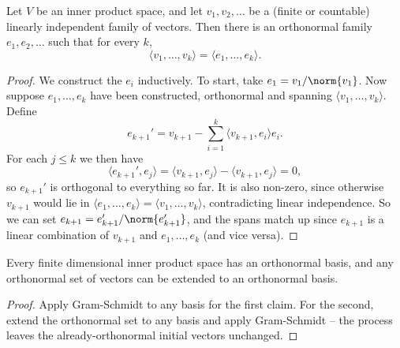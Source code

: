 \begin{center}
\end{center}

\begin{theorem}
    Let $V$ be an inner product space, and let $v_1, v_2, \dots$ be a (finite or countable) linearly independent family of vectors. Then there is an orthonormal family $e_1, e_2, \dots$ such that for every $k$,
    $$
    \langle v_1, \dots, v_k \rangle = \langle e_1, \dots, e_k \rangle.
    $$
\end{theorem}
\begin{proof}
    We construct the $e_i$ inductively. To start, take $e_1 = v_1/\norm{v_1}$. Now suppose $e_1, \dots, e_k$ have been constructed, orthonormal and spanning $\langle v_1, \dots, v_k\rangle$. Define
    $$
    e_{k+1}' = v_{k + 1} - \sum_{i = 1}^k \langle v_{k+1}, e_i \rangle e_i.
    $$
    For each $j \leq k$ we then have
    $$
    \langle e_{k+1}', e_j \rangle = \langle v_{k + 1}, e_j\rangle - \langle v_{k+1}, e_j \rangle = 0,
    $$
    so $e_{k+1}'$ is orthogonal to everything so far. It is also non-zero, since otherwise $v_{k+1}$ would lie in $\langle e_1, \dots, e_k \rangle = \langle v_1, \dots, v_k\rangle$, contradicting linear independence. So we can set $e_{k+1} = e_{k+1}'/\norm{e_{k+1}'}$, and the spans match up since $e_{k + 1}$ is a linear combination of $v_{k+1}$ and $e_1, \dots, e_k$ (and vice versa).
\end{proof}

\begin{corollary}
    Every finite dimensional inner product space has an orthonormal basis, and any orthonormal set of vectors can be extended to an orthonormal basis.
\end{corollary}
\begin{proof}
    Apply Gram-Schmidt to any basis for the first claim. For the second, extend the orthonormal set to any basis and apply Gram-Schmidt -- the process leaves the already-orthonormal initial vectors unchanged.
\end{proof}


